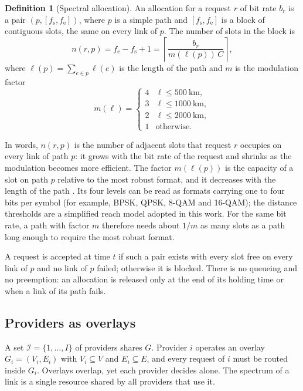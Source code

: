 \documentclass[11pt,a4paper]{article}
\theoremstyle{definition}
\newtheorem{definition}{Definition}
\begin{document}
\begin{definition}[Spectral allocation]
An allocation for a request $r$ of bit rate $b_r$ is a pair $(p,[f_\mathrm{s},f_\mathrm{e}])$, where $p$ is a simple path and $[f_\mathrm{s},f_\mathrm{e}]$ is a block of contiguous slots, the same on every link of $p$.
The number of slots in the block is
\begin{equation}
  n(r,p) = f_\mathrm{e}-f_\mathrm{s}+1 = \left\lceil \frac{b_r}{m(\ell(p))\,C} \right\rceil ,
\end{equation}
where $\ell(p)=\sum_{e\in p}\ell(e)$ is the length of the path and $m$ is the modulation factor
\begin{equation}
  m(\ell)=
  \begin{cases}
    4 & \ell\le 500\ \text{km},\\
    3 & \ell\le 1000\ \text{km},\\
    2 & \ell\le 2000\ \text{km},\\
    1 & \text{otherwise.}
  \end{cases}
\end{equation}
\end{definition}

In words, $n(r,p)$ is the number of adjacent slots that request $r$ occupies on every link of path $p$: it grows with the bit rate of the request and shrinks as the modulation becomes more efficient.
The factor $m(\ell(p))$ is the capacity of a slot on path $p$ relative to the most robust format, and it decreases with the length of the path \cite{jinno2010distance}.
Its four levels can be read as formats carrying one to four bits per symbol (for example, BPSK, QPSK, 8-QAM and 16-QAM); the distance thresholds are a simplified reach model adopted in this work.
For the same bit rate, a path with factor $m$ therefore needs about $1/m$ as many slots as a path long enough to require the most robust format.

A request is accepted at time $t$ if such a pair exists with every slot free on every link of $p$ and no link of $p$ failed; otherwise it is blocked.
There is no queueing and no preemption: an allocation is released only at the end of its holding time or when a link of its path fails.

\subsection{Providers as overlays}

A set $\mathcal{I}=\{1,\dots,I\}$ of providers shares $G$.
Provider $i$ operates an overlay $G_i=(V_i,E_i)$ with $V_i\subseteq V$ and $E_i\subseteq E$, and every request of $i$ must be routed inside $G_i$.
Overlays overlap, yet each provider decides alone.
The spectrum of a link is a single resource shared by all providers that use it.
\end{document}
